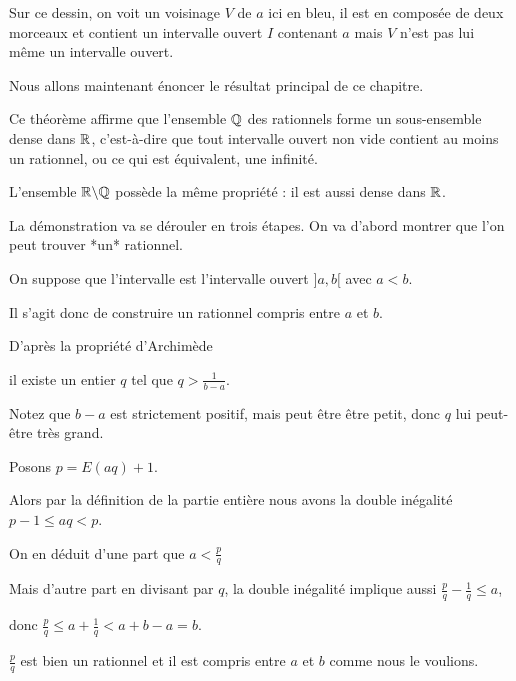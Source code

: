 Sur ce dessin, on voit un voisinage $V$ de $a$ ici en bleu, il est en 
composée de deux morceaux et contient 
un intervalle ouvert $I$ contenant $a$ mais $V$ n'est pas lui même un intervalle ouvert.

\diapo

Nous allons maintenant énoncer le résultat principal de ce chapitre.

\change

Ce théorème affirme que l'ensemble $\mathbb{Q}$ des rationnels forme un sous-ensemble dense 
dans $\mathbb{R}$, c'est-à-dire que tout intervalle ouvert non vide contient au moins un rationnel, 
ou ce qui est équivalent, une infinité.

\change

L'ensemble $\mathbb{R}\backslash\mathbb{Q}$ possède la même propriété : il est aussi dense dans $\mathbb{R}$.

\change

La démonstration va se dérouler en trois étapes.
On va d'abord montrer que l'on peut trouver *un* rationnel.

\change

On suppose que l'intervalle est l'intervalle ouvert $]a,b[$ avec $a<b$.

Il s'agit donc de construire un rationnel compris entre $a$ et $b$.

\change

D'après la propriété d'Archimède

il existe un entier $q$ tel que $q>\frac{1}{b-a}$. 

Notez que $b-a$ est strictement positif, mais peut être être petit, donc $q$ lui peut-être très grand.

\change

Posons $p=E(aq)+1$. 


\change

Alors par la définition de la partie entière nous avons
la double inégalité $p-1\leq aq<p$. 

On en déduit d'une part que $a<\frac pq$

\change

Mais d'autre part en divisant par $q$, la double inégalité implique aussi $\frac pq- \frac 1q\leq a$, 

donc $\frac pq \leq a+\frac 1q < a+b-a=b$. 

\change

$\frac pq$ est bien un rationnel et il est compris entre $a$ et $b$ comme nous le voulions.

